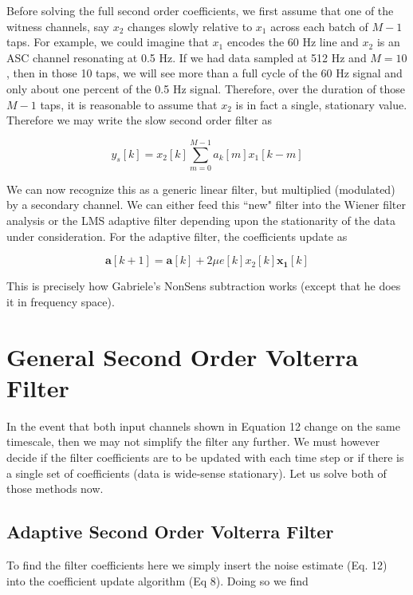 \documentclass{article}
\begin{document}
Before solving the full second order coefficients, we first assume that one of the
witness channels, say $x_2$ changes slowly relative to $x_1$ across each batch of
$M-1$ taps. For example, we could imagine that $x_1$ encodes the 60 Hz line and
$x_2$ is an ASC channel resonating at 0.5 Hz. If we had data sampled at 512 Hz and
$M=10$, then in those 10 taps, we will see more than a full cycle of the 60 Hz
signal and only about one percent of the 0.5 Hz signal. Therefore, over the
duration of those $M-1$ taps, it is reasonable to assume that $x_2$ is in fact
a single, stationary value. Therefore we may write the slow second order filter as

\begin{equation}
    y_s[k] = x_2[k]\sum_{m=0}^{M-1}a_k[m]x_1[k-m]
\end{equation}

We can now recognize this as a generic linear filter, but multiplied (modulated)
by a secondary channel. We can either feed this ``new" filter into the Wiener
filter analysis or the LMS adaptive filter depending upon the stationarity of
the data under consideration. For the adaptive filter, the coefficients update as

\begin{equation}
    \mathbf{a}[k+1] = \mathbf{a}[k] + 2\mu e[k]x_2[k]\mathbf{x_1}[k]
\end{equation}

This is precisely how Gabriele's NonSens subtraction works (except that he does
it in frequency space).

\section{General Second Order Volterra Filter}
In the event that both input channels shown in Equation 12 change on the same
timescale, then we may not simplify the filter any further. We must however
decide if the filter coefficients are to be updated with each time step or if
there is a single set of coefficients (data is wide-sense stationary). Let us
solve both of those methods now.

\subsection{Adaptive Second Order Volterra Filter}
To find the filter coefficients here we simply insert the noise estimate
(Eq. 12) into the coefficient update algorithm (Eq 8). Doing so we find
\end{document}
